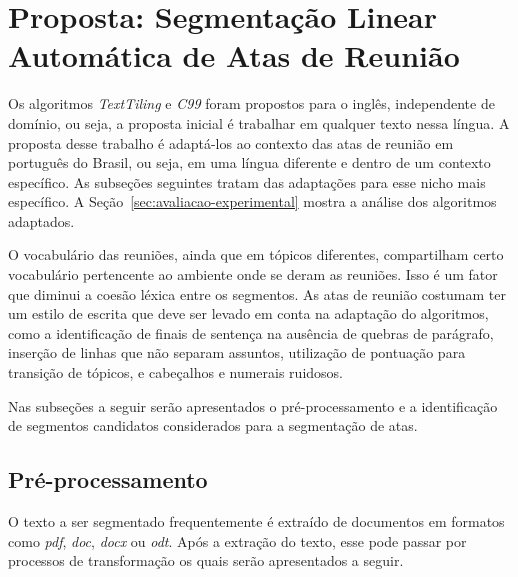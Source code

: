 \section{Proposta: Segmentação Linear Automática de Atas de Reunião}
	\label{sec:proposta}






Os algoritmos \textit{TextTiling} e \textit{C99} foram propostos para o inglês, independente de domínio, ou seja, a proposta inicial é trabalhar em qualquer texto nessa língua.
A proposta desse trabalho é adaptá-los ao contexto das atas de reunião em português do Brasil, ou seja, em uma língua diferente e dentro de um contexto específico. As subseções seguintes tratam das adaptações para esse nicho mais específico. A Seção~\ref{sec:avaliacao-experimental} mostra a análise dos algoritmos adaptados.

O vocabulário das reuniões, ainda que em tópicos diferentes, compartilham certo vocabulário pertencente ao ambiente onde se deram as reuniões. Isso é um fator que diminui a coesão léxica entre os segmentos.
As atas de reunião costumam ter um estilo de escrita que deve ser levado em conta na adaptação do algoritmos, como a identificação de finais de sentença na ausência de quebras de parágrafo, inserção de linhas que não separam assuntos, utilização de pontuação para transição de tópicos, e cabeçalhos e numerais ruidosos. 

Nas subseções a seguir serão apresentados o pré-processamento e a identificação de segmentos candidatos considerados para a segmentação de atas.





\subsection{Pré-processamento}
	\label{subsec:preprocessamento}




	O texto a ser segmentado frequentemente é extraído de documentos em formatos como \textit{pdf}, \textit{doc}, \textit{docx} ou \textit{odt}. Após a extração do texto, esse pode passar por processos de transformação os quais serão apresentados a seguir.
	

